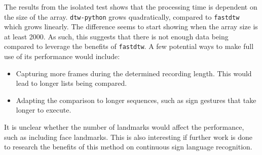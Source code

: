 \documentclass[final,rdr32.tex]{subfiles}
\begin{document}
The results from the isolated test shows that the processing time is dependent on the size of the array. \verb|dtw-python| grows quadratically, compared to \verb|fastdtw| which grows linearly. The difference seems to start showing when the array size is at least 2000. As such, this suggests that there is not enough data being compared to leverage the benefits of \verb|fastdtw|. A few potential ways to make full use of its performance would include:
\begin{itemize}
    \item Capturing more frames during the determined recording length. This would lead to longer lists being compared.
    \item Adapting the comparison to longer sequences, such as sign gestures that take longer to execute.
\end{itemize}

It is unclear whether the number of landmarks would affect the performance, such as including face landmarks. This is also interesting if further work is done to research the benefits of this method on continuous sign language recognition.
\end{document}
